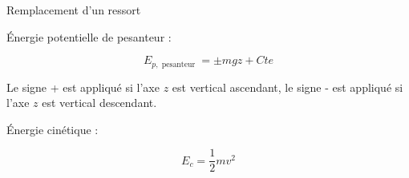 \begin{exo}[PC][1][oral]{Remplacement d'un ressort}
{\begin{liste}
  \item Énergie potentielle de pesanteur :

$$
E_{p, \text { pesanteur }}= \pm m g z+C t e
$$

Le signe + est appliqué si l'axe $z$ est vertical ascendant, le signe - est appliqué si l'axe $z$ est vertical descendant.

  \item Énergie cinétique :
  
  $$
  E_{c}=\frac{1}{2} m v^{2}
  $$
\end{liste}
}

\end{exo}

